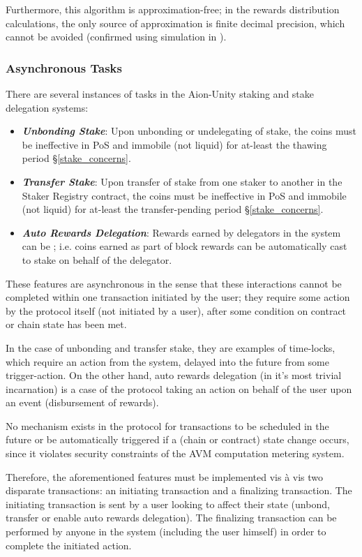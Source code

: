 Furthermore, this algorithm is approximation-free; in the rewards distribution calculations, the only source of approximation is finite decimal precision, which cannot be avoided (confirmed using simulation in \cite{Sha19}).  

\clearpage
\subsubsection{Asynchronous Tasks}
There are several instances of  tasks in the Aion-Unity staking and stake delegation systems: 
\begin{itemize}
    \item \textit{\textbf{Unbonding Stake}}: Upon unbonding or undelegating of stake, the coins must be ineffective in PoS and immobile (not liquid) for at-least the thawing period \S\ref{stake_concerns}.  
    \item \textit{\textbf{Transfer Stake}}: Upon transfer of stake from one staker to another in the Staker Registry contract, the coins must be ineffective in PoS and immobile (not liquid) for at-least the transfer-pending period \S\ref{stake_concerns}.  
    \item \textit{\textbf{Auto Rewards Delegation}}: Rewards earned by delegators in the system can be ; i.e. coins earned as part of block rewards can be automatically cast to stake on behalf of the delegator.  
\end{itemize}

These features are asynchronous in the sense that these interactions cannot be completed within one transaction initiated by the user; they require some action by the protocol itself (not initiated by a user), after some condition on contract or chain state has been met.   

In the case of unbonding and transfer stake, they are examples of time-locks, which require an action from the system, delayed into the future from some trigger-action. On the other hand, auto rewards delegation (in it's most trivial incarnation) is a case of the protocol taking an action on behalf of the user upon an event (disbursement of rewards).

No mechanism exists in the protocol for transactions to be scheduled in the future or be automatically triggered if a (chain or contract) state change occurs, since it violates security constraints of the AVM computation metering system. 

Therefore, the aforementioned features must be implemented vis à vis two disparate transactions: an initiating transaction and a finalizing transaction. The initiating transaction is sent by a user looking to affect their state (unbond, transfer or enable auto rewards delegation). The finalizing transaction can be performed by anyone in the system (including the user himself) in order to complete the initiated action.

